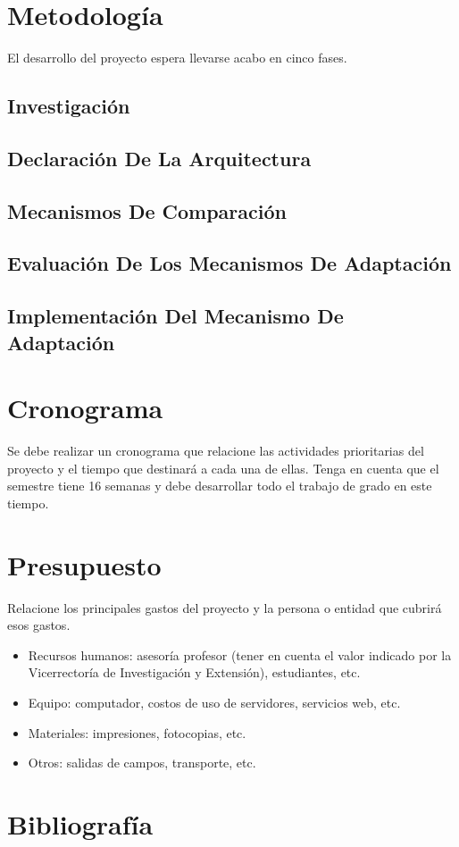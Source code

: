 \documentclass[12pt]{article}
\begin{document}
    \section{Metodología}

    El desarrollo del proyecto espera llevarse acabo en cinco fases.

    \subsection{Investigación}


    \subsection{Declaración De La Arquitectura}
    

    \subsection{Mecanismos De Comparación}
    \subsection{Evaluación De Los Mecanismos De Adaptación}
    \subsection{Implementación Del Mecanismo De Adaptación}


    \section{Cronograma}

    Se debe realizar un cronograma que relacione las actividades prioritarias del proyecto y el tiempo que destinará a cada una de ellas.  Tenga en cuenta que el semestre tiene 16 semanas y debe desarrollar todo el trabajo de grado en este tiempo.

    \section{Presupuesto}

    Relacione los principales gastos del proyecto y la persona o entidad que cubrirá esos gastos.

    \begin{itemize}
        
        \item Recursos humanos:  asesoría profesor (tener en cuenta el valor indicado por la Vicerrectoría de Investigación y Extensión), estudiantes, etc.
        \item Equipo:  computador, costos de uso de servidores, servicios web, etc.
        \item Materiales:  impresiones, fotocopias, etc.
        \item Otros:  salidas de campos, transporte, etc.
        
    \end{itemize}

    \pagebreak

    \section{Bibliografía}

    
\end{document}
